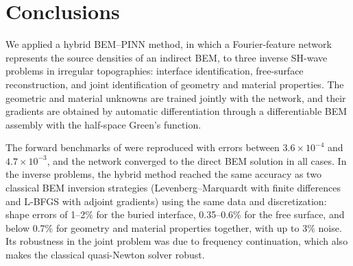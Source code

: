 \documentclass[11pt,twoside]{article}
\begin{document}
\section{Conclusions}\label{sec:conclusions}

We applied a hybrid BEM--PINN method, in which a Fourier-feature network represents the source densities of an indirect BEM, to three inverse SH-wave problems in irregular topographies: interface identification, free-surface reconstruction, and joint identification of geometry and material properties. The geometric and material unknowns are trained jointly with the network, and their gradients are obtained by automatic differentiation through a differentiable BEM assembly with the half-space Green's function.

The forward benchmarks of \citet{wu_novel_2026} were reproduced with errors between $3.6\times10^{-4}$ and $4.7\times10^{-3}$, and the network converged to the direct BEM solution in all cases. In the inverse problems, the hybrid method reached the same accuracy as two classical BEM inversion strategies (Levenberg--Marquardt with finite differences and L-BFGS with adjoint gradients) using the same data and discretization: shape errors of 1--2\% for the buried interface, 0.35--0.6\% for the free surface, and below 0.7\% for geometry and material properties together, with up to 3\% noise. Its robustness in the joint problem was due to frequency continuation, which also makes the classical quasi-Newton solver robust.
\end{document}
